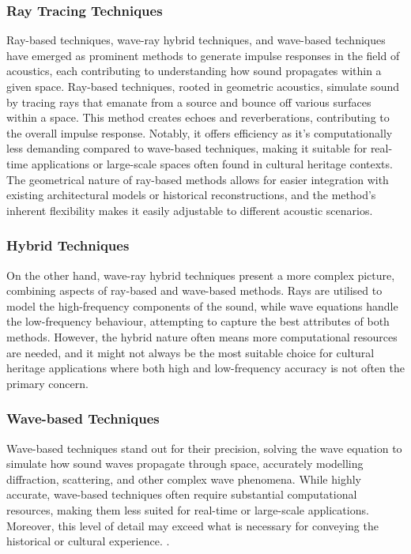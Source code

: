 \subsubsection{Ray Tracing Techniques}
\label{sec:bg-raytracing}
Ray-based techniques, wave-ray hybrid techniques, and wave-based techniques have emerged as prominent methods to generate impulse responses in the field of acoustics, each contributing to understanding how sound propagates within a given space. Ray-based techniques, rooted in geometric acoustics, simulate sound by tracing rays that emanate from a source and bounce off various surfaces within a space. This method creates echoes and reverberations, contributing to the overall impulse response. Notably, it offers efficiency as it's computationally less demanding compared to wave-based techniques, making it suitable for real-time applications or large-scale spaces often found in cultural heritage contexts. The geometrical nature of ray-based methods allows for easier integration with existing architectural models or historical reconstructions, and the method's inherent flexibility makes it easily adjustable to different acoustic scenarios. \cite{vorlander2008simulation}

\subsubsection{Hybrid Techniques}
On the other hand, wave-ray hybrid techniques present a more complex picture, combining aspects of ray-based and wave-based methods. Rays are utilised to model the high-frequency components of the sound, while wave equations handle the low-frequency behaviour, attempting to capture the best attributes of both methods. However, the hybrid nature often means more computational resources are needed, and it might not always be the most suitable choice for cultural heritage applications where both high and low-frequency accuracy is not often the primary concern. \cite{hulusic2012acoustic}

\subsubsection{Wave-based Techniques}
Wave-based techniques stand out for their precision, solving the wave equation to simulate how sound waves propagate through space, accurately modelling diffraction, scattering, and other complex wave phenomena. While highly accurate, wave-based techniques often require substantial computational resources, making them less suited for real-time or large-scale applications. Moreover, this level of detail may exceed what is necessary for conveying the historical or cultural experience. \cite{hamilton2017fdtd, raghuvanshi2014parametric}.\par

